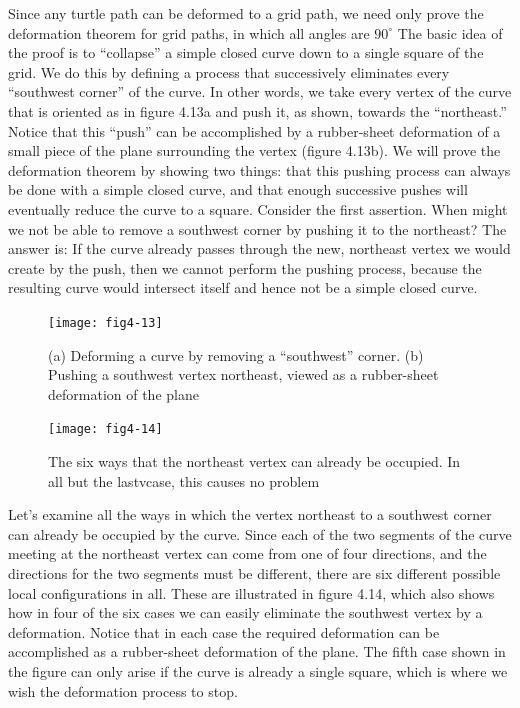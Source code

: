 \documentclass{book}
\begin{document}
Since any turtle path can be deformed to a grid path, we need only
prove the deformation theorem for grid paths, in which all angles are
$90^{\circ}$ The basic idea of the proof is to ``collapse'' a simple closed curve
down to a single square of the grid. We do this by defining a process that
successively eliminates every ``southwest corner'' of the curve. In other
words, we take every vertex of the curve that is oriented as in figure
4.13a and push it, as shown, towards the ``northeast.'' Notice that this
``push'' can be accomplished by a rubber-sheet deformation of a small
piece of the plane surrounding the vertex (figure 4.13b).
We will prove the deformation theorem by showing two things: that
this pushing process can always be done with a simple closed curve,
and that enough successive pushes will eventually reduce the curve to
a square. Consider the first assertion. When might we not be able to
remove a southwest corner by pushing it to the northeast? The answer
is: If the curve already passes through the new, northeast vertex we
would create by the push, then we cannot perform the pushing process,
because the resulting curve would intersect itself and hence not be a
simple closed curve.

\begin{figure}
\begin{center}
\texttt{[image: fig4-13]}
\caption{(a) Deforming a curve by removing a ``southwest'' corner. (b) Pushing a southwest vertex northeast, viewed as a rubber-sheet deformation of the plane}
\end{center}
\end{figure}

\begin{figure}
\begin{center}
\texttt{[image: fig4-14]}
\caption{The six ways that the northeast vertex can already be occupied. In all but the lastvcase, this causes no problem}
\end{center}
\end{figure}

Let's examine all the ways in which the vertex northeast to a southwest 
corner can already be occupied by the curve. Since each of the two
segments of the curve meeting at the northeast vertex can come from
one of four directions, and the directions for the two segments must
be different, there are six different possible local configurations in all.
These are illustrated in figure 4.14, which also shows how in four of the
six cases we can easily eliminate the southwest vertex by a deformation.
Notice that in each case the required deformation can be accomplished
as a rubber-sheet deformation of the plane. The fifth case shown in
the figure can only arise if the curve is already a single square, which is
where we wish the deformation process to stop.
\end{document}
